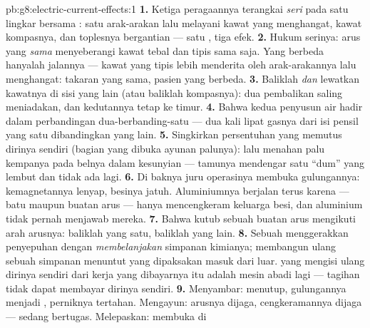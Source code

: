 \begin{solution}{pb:g8:electric-current-effects:1}
\textbf{1.} Ketiga peragaannya terangkai \emph{seri} pada satu lingkar
bersama : satu arak-arakan lalu melayani kawat yang
menghangat, kawat kompasnya, dan toplesnya bergantian --- satu
, tiga efek.
\textbf{2.} Hukum serinya: arus yang \emph{sama} menyeberangi kawat
tebal dan tipis sama saja. Yang berbeda hanyalah jalannya --- kawat
yang tipis lebih menderita oleh arak-arakannya lalu menghangat:
takaran yang sama, pasien yang berbeda.
\textbf{3.} Baliklah  \emph{dan} lewatkan kawatnya di sisi
 yang lain (atau baliklah kompasnya): dua pembalikan saling
meniadakan, dan kedutannya tetap ke timur.
\textbf{4.} Bahwa kedua penyusun air hadir dalam perbandingan
dua-berbanding-satu --- dua kali lipat gasnya dari isi pensil yang satu
dibandingkan yang lain.
\textbf{5.} Singkirkan persentuhan yang memutus dirinya sendiri
(bagian yang dibuka ayunan palunya):  lalu menahan
palu kempanya pada belnya dalam kesunyian --- tamunya mendengar satu
``dum'' yang lembut dan tidak ada lagi.
\textbf{6.} Di baknya juru operasinya membuka  gulungannya:
kemagnetannya lenyap, besinya jatuh. Aluminiumnya berjalan terus
karena  --- batu maupun buatan arus --- hanya mencengkeram
keluarga besi, dan aluminium tidak pernah menjawab mereka.
\textbf{7.} Bahwa kutub sebuah  buatan arus mengikuti arah
arusnya: baliklah yang satu, baliklah yang lain.
\textbf{8.} Sebuah  menggerakkan penyepuhan dengan
\emph{membelanjakan} simpanan kimianya; membangun ulang sebuah
simpanan menuntut  yang dipaksakan masuk dari luar.  yang
mengisi ulang dirinya sendiri dari kerja yang dibayarnya itu adalah
mesin abadi lagi --- tagihan  tidak dapat membayar dirinya
sendiri.
\textbf{9.} Menyambar:  menutup, gulungannya menjadi ,
perniknya tertahan. Mengayun: arusnya dijaga, cengkeramannya dijaga
---  sedang bertugas. Melepaskan:  membuka di

\end{solution}
